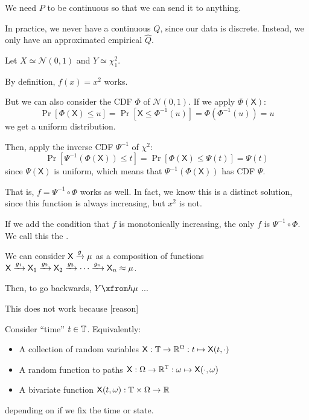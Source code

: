 \documentclass[notes]{agony}
\newcommand{\rv}{\mathsf}
\renewcommand{\N}{\mathcal{N}}
\begin{document}
We need $P$ to be continuous so that we can send it to anything.

In practice, we never have a continuous $Q$, since our data is discrete.
Instead, we only have an approximated empirical $\hat Q$.

\begin{example}
	Let $X \simeq \N(0,1)$ and $Y \simeq \chi_1^2$.
\end{example}
\begin{sol}
	By definition, $f(x) = x^2$ works.

	But we can also consider the CDF $\Phi$ of $\N(0,1)$.
	If we apply $\Phi(\rv X)$:
	\[ \Pr[\Phi(\rv X) \leq u] = \Pr[\rv X \leq \Phi^{-1}(u)] = \Phi(\Phi^{-1}(u)) = u \]
	we get a uniform distribution.

	Then, apply the inverse CDF $\Psi^{-1}$ of $\chi^2$:
	\[ \Pr[\Psi^{-1}(\Phi(\rv X)) \leq t] = \Pr[\Phi(\rv X) \leq \Psi(t)] = \Psi(t) \]
	since $\Psi(\rv X)$ is uniform,
	which means that $\Psi^{-1}(\Phi(\rv X))$ has CDF $\Psi$.

	That is, $f = \Psi^{-1} \circ \Phi$ works as well.
	In fact, we know this is a distinct solution,
	since this function is always increasing, but $x^2$ is not.
\end{sol}

\begin{remark}
	If we add the condition that $f$ is monotonically increasing,
	the only $f$ is $\Psi^{-1} \circ \Phi$.
	We call this the .
\end{remark}

We can consider $\rv X \xto g \mu$ as a composition of functions
$\rv X \xto{g_1} \rv X_1 \xto{g_2} \rv X_2 \xto{g_3} \dotsb \xto{g_n} \rv X_n \approx \mu$.

Then, to go backwards, $Y \xfrom h \mu$ ...

This does not work because [reason]

\begin{defn}
	Consider ``time'' $t \in \mathbb T$. Equivalently:
	\begin{itemize}[nosep]
		\item A collection of random variables $\rv X : \bb T \to \R^{\Omega} : t \mapsto \rv X(t,\cdot)$
		\item A random function to paths $\rv X : \Omega \to \R^{\bb T} : \omega \mapsto \rv X(\cdot,\omega)$
		\item A bivariate function $\rv X(t,\omega) : \bb T \times \Omega \to \R$
	\end{itemize}
	depending on if we fix the time or state.
\end{defn}
\end{document}
